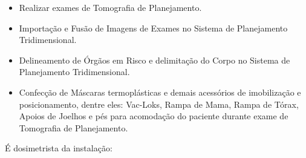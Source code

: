 \begin{itemize}
    \item Realizar exames de Tomografia de Planejamento.
    \item Importação e Fusão de Imagens de Exames no Sistema de Planejamento Tridimensional.
    \item Delineamento de Órgãos em Risco e delimitação do Corpo no Sistema de Planejamento Tridimensional.
    \item Confecção de Máscaras termoplásticas e demais acessórios de imobilização e posicionamento, dentre eles: Vac-Loks, Rampa de Mama, Rampa de Tórax, Apoios de Joelhos e pés para acomodação do paciente durante exame de Tomografia de Planejamento.
\end{itemize}

É dosimetrista da instalação:

\begin{table}[!h]
    \centering
    \caption{Equipe de Dosimetristas.}
    \label{tab:dosimetristas}
\end{table}
 
